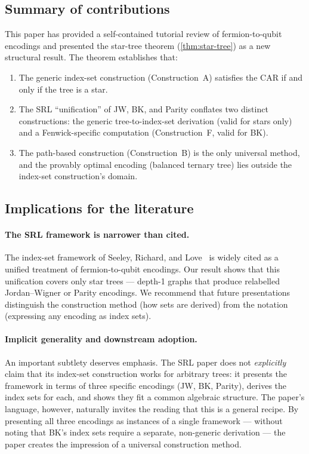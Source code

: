 %

\subsection{Summary of contributions}

This paper has provided a self-contained tutorial review of
fermion-to-qubit encodings and presented the star-tree theorem
(\cref{thm:star-tree}) as a new structural result.  The theorem
establishes that:

\begin{enumerate}
  \item The generic index-set construction (Construction~A) satisfies
    the CAR if and only if the tree is a star.
  \item The SRL ``unification'' of JW, BK, and Parity conflates two
    distinct constructions: the generic tree-to-index-set derivation
    (valid for stars only) and a Fenwick-specific computation
    (Construction~F, valid for BK).
  \item The path-based construction (Construction~B) is the only
    universal method, and the provably optimal encoding (balanced
    ternary tree) lies outside the index-set construction's domain.
\end{enumerate}

\subsection{Implications for the literature}
\label{sec:implications-literature}

\paragraph{The SRL framework is narrower than cited.}
The index-set framework of Seeley, Richard, and
Love~\cite{seeley2012} is widely cited as a unified treatment of
fermion-to-qubit encodings.  Our result shows that this unification
covers only star trees --- depth-1 graphs that produce relabelled
Jordan--Wigner or Parity encodings.  We recommend that future
presentations distinguish the construction method (how sets are
derived) from the notation (expressing any encoding as index sets).

\paragraph{Implicit generality and downstream adoption.}
An important subtlety deserves emphasis.  The SRL paper does not
\emph{explicitly} claim that its index-set construction works for
arbitrary trees: it presents the framework in terms of three specific
encodings (JW, BK, Parity), derives the index sets for each, and
shows they fit a common algebraic structure.  The paper's language,
however, naturally invites the reading that this is a general recipe.
By presenting all three encodings as instances of a single framework
--- without noting that BK's index sets require a separate, non-generic
derivation --- the paper creates the impression of a universal
construction method.

